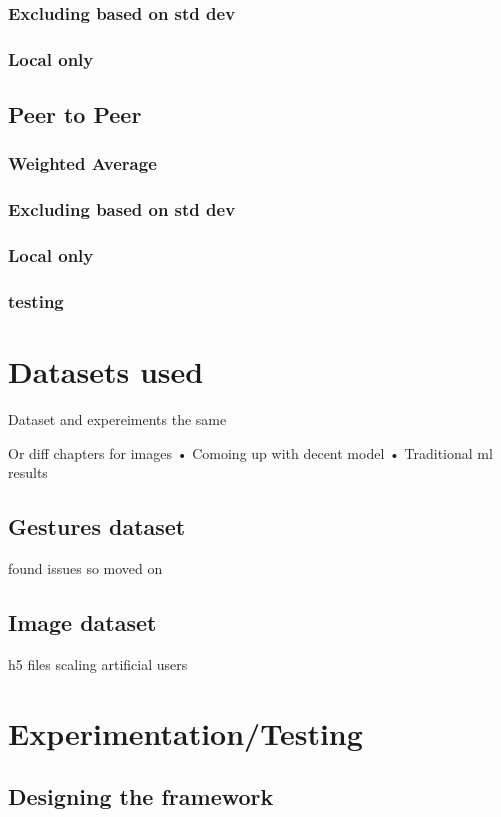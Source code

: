 \documentclass[12pt]{article}
\begin{document}
\subsubsection{Excluding based on std dev}
\subsubsection{Local only}
\subsection{Peer to Peer}
\subsubsection{Weighted Average}
\subsubsection{Excluding based on std dev}
\subsubsection{Local only}
\subsubsection{testing}

\clearpage
\section{Datasets used}\label{sec:experiments}
Dataset and expereiments the same

Or diff chapters for images 
• Comoing up with decent model
• Traditional ml results

\subsection{Gestures dataset}\label{subsec:gestureset}
found issues so moved on
\subsection{Image dataset}\label{subsec:imageset}
h5 files
scaling
artificial users
\clearpage
\section{Experimentation/Testing}
\subsection{Designing the framework}
\end{document}
